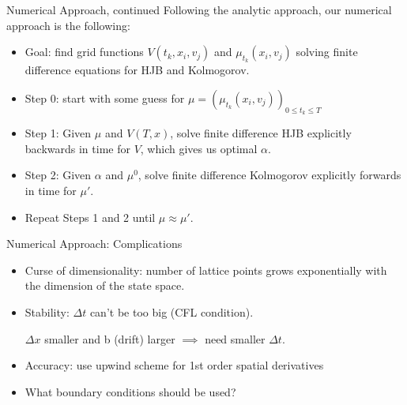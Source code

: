 \documentclass{beamer}
\begin{document}
\begin{frame}{Numerical Approach, continued}
	Following the analytic approach, our numerical approach is the following:
	\begin{itemize}
			\item {
				Goal: find grid functions $V(t_k,x_i,v_j)$ and $\mu_{t_k}(x_i,v_j)$ solving finite difference equations for HJB and Kolmogorov.
			}
			\item {
				Step 0: start with some guess for $\mu=(\mu_{t_k}(x_i,v_j))_{0 \leq t_k \leq T}$
			}
			\item {
				Step 1: Given $\mu$ and $V(T,x)$, solve finite difference HJB explicitly backwards in time for $V$, which gives us optimal $\alpha$.
			}
			\item {
				Step 2: Given $\alpha$ and $\mu^0$, solve finite difference Kolmogorov explicitly forwards in time for $\mu '$.
			}
			\item {
				Repeat Steps 1 and 2 until $\mu \approx \mu '$.
			}
	\end{itemize}
\end{frame}

\begin{frame}{Numerical Approach: Complications}
		\begin{itemize}
			\item {
				Curse of dimensionality: number of lattice points grows exponentially with the dimension of the state space.
				
			}
			\item {
				Stability: $\Delta t$ can't be too big (CFL condition).
				\begin{center}
					$\Delta x$ smaller and b (drift) larger $\implies$ need smaller $\Delta t$.
				\end{center}
			}
			\item {
				Accuracy: use upwind scheme for 1st order spatial derivatives
			}
			\item {
				What boundary conditions should be used?
			}
		\end{itemize}
\end{frame}
\end{document}
